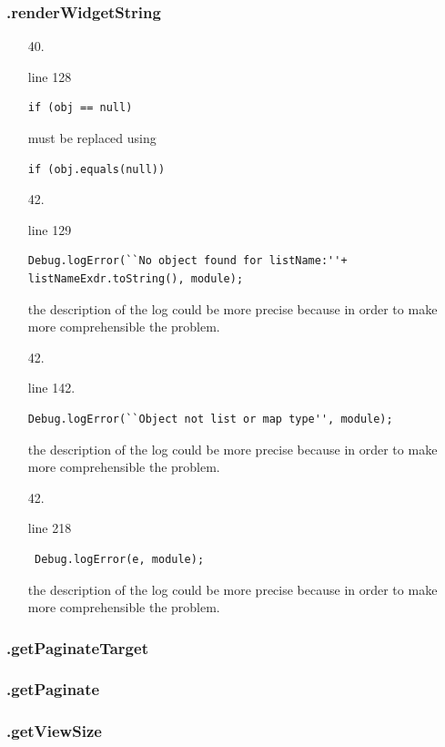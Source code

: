 \documentclass[english]{article}
\begin{document}
\subsubsection*{.renderWidgetString}
\begin{itemize}
	\item[40.]{ line 128
		\begin{lstlisting}
if (obj == null)
		\end{lstlisting} must be replaced using
		\begin{lstlisting}
if (obj.equals(null))
		\end{lstlisting}}
	\item[42.]{line 129
		\begin{lstlisting}
Debug.logError(``No object found for listName:''+ listNameExdr.toString(), module);
		\end{lstlisting}
		the description of the log could be more precise because in order to make more comprehensible the problem.}
	\item[42.]{line 142.		\begin{lstlisting} 
Debug.logError(``Object not list or map type'', module);
		\end{lstlisting}
		the description of the log could be more precise because in order to make more comprehensible the problem.}
	\item[42.]{line 218
		\begin{lstlisting} 
 Debug.logError(e, module);
		\end{lstlisting}
		the description of the log could be more precise because in order to make more comprehensible the problem.}
	
\end{itemize}

\subsubsection*{.getPaginateTarget}
\subsubsection*{.getPaginate}
\subsubsection*{.getViewSize}
\end{document}

